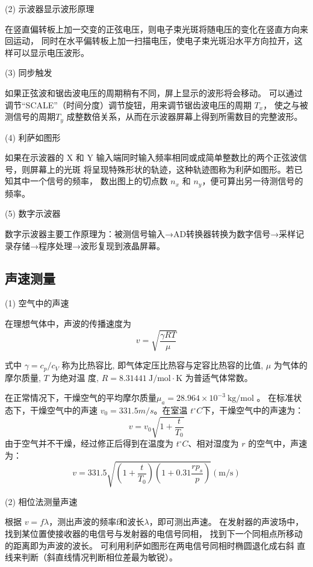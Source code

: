 \documentclass[UTF8]{ctexart}
\begin{document}
    \noindent (2) 示波器显示波形原理

    在竖直偏转板上加一交变的正弦电压，则电子束光斑将随电压的变化在竖直方向来回运动，
    同时在水平偏转板上加一扫描电压，使电子束光斑沿水平方向拉开，这样可以显示电压波形。

    \noindent (3) 同步触发

    如果正弦波和锯齿波电压的周期稍有不同，屏上显示的波形将会移动。
    可以通过调节“SCALE”（时间分度）调节旋钮，用来调节锯齿波电压的周期 $T_x$，
    使之与被测信号的周期$ T_y$ 成整数倍关系，从而在示波器屏幕上得到所需数目的完整波形。
    
    \noindent (4) 利萨如图形

    如果在示波器的 X 和 Y 输入端同时输入频率相同或成简单整数比的两个正弦波信号，则屏幕上的光斑
    将呈现特殊形状的轨迹，这种轨迹图称为利萨如图形。若已知其中一个信号的频率，
    数出图上的切点数 $n_x$ 和 $n_y$，便可算出另一待测信号的频率。

    \noindent (5) 数字示波器

    数字示波器主要工作原理为：被测信号输入→AD转换器转换为数字信号→采样记录存储→程序处理→波形复现到液晶屏幕。


    \subsection{声速测量}

    \noindent (1) 空气中的声速

    在理想气体中，声波的传播速度为
    $$
    v=\sqrt{\frac{\gamma R T}{\mu}}
    $$

    式中  $\gamma=c_{p} / c_{V}$  称为比热容比, 即气体定压比热容与定容比热容的比值,  $\mu$  为气体的摩尔质量, 
    $T $ 为绝对温 度,  $R=8.31441 \mathrm{~J} / \mathrm{mol} \cdot \mathrm{K}$  为普适气体常数。
    
    在正常情况下，干燥空气的平均摩尔质量$\mu_{a}=28.964 \times 10^{-3} \mathrm{~kg} / \mathrm{mol} $ 。
    在标准状态下，干燥空气中的声速 $v_0=331.5m/s$。在室温 $t^\circ C$下，干燥空气中的声速为：
    $$
    v=v_{0} \sqrt{1+\frac{t}{T_{0}}}
    $$  
    由于空气并不干燥，经过修正后得到在温度为 $t^\circ C$、相对湿度为 $r$ 的空气中，声速为：
    $$
    v=331.5 \sqrt{\left(1+\frac{t}{T_{0}}\right)\left(1+0.31 \frac{r p_{s}}{p}\right)}(\mathrm{m} / \mathrm{s})
    $$

    \noindent (2) 相位法测量声速
    
根据 $v=f\lambda$，测出声波的频率f和波长$\lambda$，即可测出声速。
在发射器的声波场中，找到某位置使接收器的电信号与发射器的电信号同相，
找到下一个同相点所移动的距离即为声波的波长。
可利用利萨如图形在两电信号同相时椭圆退化成右斜
直线来判断（斜直线情况判断相位差最为敏锐）。
    
\end{document}
